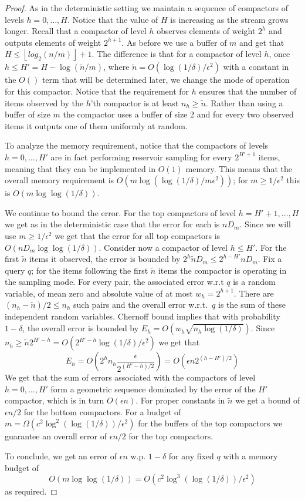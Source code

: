 \documentclass[12pt]{colt2019} %
\newcommand{\eps}{\epsilon}
\newcommand{\floor}[1]{\left \lfloor #1 \right \rfloor}
\begin{document}
\begin{proof}
As in the deterministic setting we maintain a sequence of compactors of levels $h=0,\ldots,H$. Notice that the value of $H$ is increasing as the stream grows longer. Recall that a compactor of level $h$ observes elements of weight $2^h$ and outputs elements of weight $2^{h+1}$. As before we use a buffer of $m$ and get that $H \leq  \floor{log_2(n/m)}+1$.
The difference is that for a compactor of level $h$, once $h \leq H' = H - \log(\tilde{n}/m)$, where $\tilde{n} = O(\log(1/\delta)/\eps^2)$ with a constant in the $O()$ term that will be determined later, we change the mode of operation for this compactor. Notice that the requirement for $h$ ensures that the number of items observed by the $h$'th compactor is at least $n_h \geq \tilde{n}$. Rather than using a buffer of size $m$ the compactor uses a buffer of size 2 and for every two observed items it outputs one of them uniformly at random.

To analyze the memory requirement, notice that the compactors of levels $h=0,\ldots,H'$ are in fact performing reservoir sampling for every $2^{H'+1}$ items, meaning that they can be implemented in $O(1)$ memory. This means that the overall memory requirement is $O(m\log(\log(1/\delta)/m\eps^2))$; for $m \geq 1/\eps^2$ this is $O(m\log\log(1/\delta))$. 

We continue to bound the error. For the top compactors of level $h=H'+1,\ldots,H$ we get as in the deterministic case that the error for each is $n D_m$. Since we will use $m \geq 1/\eps^2$ we get that the error for all top compactors is $O(nD_m\log\log(1/\delta))$.
Consider now a compactor of level $h \leq H'$. For the first $\tilde{n}$ items it observed, the error is bounded by $2^h\tilde{n}D_m \leq 2^{h-H'}nD_m$. Fix a query $q$; for the items following the first $\tilde{n}$ items the compactor is operating in the sampling mode. For every pair, the associated error w.r.t $q$ is a random variable, of mean zero and absolute value of at most $w_h=2^{h+1}$. There are $(n_h-\tilde{n})/2 \leq n_h$ such pairs and the overall error w.r.t.\ $q$ is the sum of these independent random variables. Chernoff bound implies that with probability $1-\delta$, the overall error is bounded by $E_h = O(w_h\sqrt{n_h\log(1/\delta)})$. Since $n_h \geq \tilde{n}2^{H'-h} = O(2^{H'-h}\log(1/\delta)/\eps^2)$ we get that
$$ E_h = O\left(2^h n_h\frac{\eps}{2^{(H'-h)/2}}\right) = O(\eps n 2^{(h-H')/2}) $$
We get that the sum of errors associated with the compactors of level $h=0,\ldots,H'$ form a geometric sequence dominated by the error of the $H'$ compactor, which is in turn $O(\eps n)$. For proper constants in $\tilde{n}$ we get a bound of $\eps n/2$ for the bottom compactors. For a budget of $m = \Omega(c^2\log^2(\log(1/\delta))/\eps^2)$ for the buffers of the top compactors we guarantee an overall error of $\eps n/2$ for the top compactors. 

To conclude, we get an error of $\eps n$ w.p. $1-\delta$ for any fixed $q$ with a memory budget of
$$O(m\log\log(1/\delta)) = O\left(c^2\log^3(\log(1/\delta))/\eps^2\right)$$
as required.
\end{proof}
\end{document}
